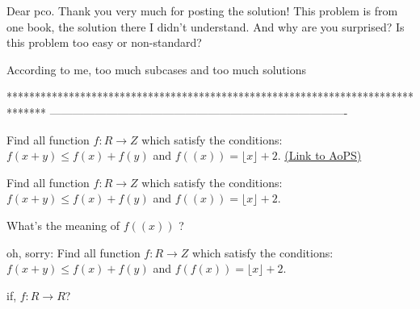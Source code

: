 \begin{solution}
	\begin{tcolorbox}Dear pco. Thank you very much for posting the solution! This problem is from one book, the solution there I didn't understand. And why are you surprised? Is this problem too easy or non-standard?\end{tcolorbox}
According to me, too much subcases and too much solutions
\end{solution}
*******************************************************************************
-------------------------------------------------------------------------------

\begin{problem}
	Find all function  $f:R\rightarrow Z$  which satisfy the conditions:
$ f(x+y)\le f(x)+f(y) $ and
$ f((x))=\lfloor x \rfloor +2$.
	\flushright \href{https://artofproblemsolving.com/community/c6h537104}{(Link to AoPS)}
\end{problem}



\begin{solution}
	\begin{tcolorbox}Find all function  $f:R\rightarrow Z$  which satisfy the conditions:
$ f(x+y)\le f(x)+f(y) $ and
$ f((x))=\lfloor x \rfloor +2$.\end{tcolorbox}
What's the meaning of $ f((x))$ ?
\end{solution}



\begin{solution}
	oh, sorry:
Find all function  $f:R\rightarrow Z$  which satisfy the conditions:
$ f(x+y)\le f(x)+f(y) $ and
$ f(f(x))=\lfloor x \rfloor +2$.
\end{solution}



\begin{solution}
	if,  $f:R\rightarrow R$?
\end{solution}



